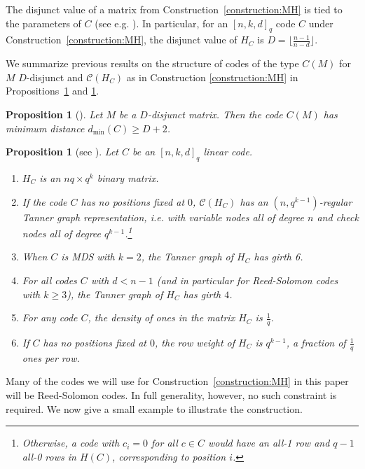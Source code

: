 \documentclass[11pt]{amsart}
\newtheorem{proposition}[theorem]{Proposition}
\theoremstyle{definition}
\newcommand{\0}{\mathbf{0}}
\begin{document}
The disjunct value of a matrix from Construction~\ref{construction:MH} is tied to the  parameters of $C$ (see e.g. \cite{kautz1964nonrandom, du2000combinatorial}). In particular, for an $[n,k,d]_q$ code $C$ under Construction~\ref{construction:MH}, the disjunct value of $H_{C}$ is $D = \lfloor \frac{n-1}{n-d} \rfloor$. 

We summarize previous results on the structure of codes of the type $C(M)$ for $M$ $D$-disjunct and $\mathcal{C}(H_C)$ as in Construction \ref{construction:MH} in Propositions~\ref{prop:mindis} and \ref{prop:properties}. 

\begin{proposition}[\cite{haymaker2025parity}] \label{prop:mindis}
    Let $M$ be a $D$-disjunct matrix. Then the code $C(M)$ has minimum distance $d_{\text{min}}(C) \geq D+2$.
\end{proposition}


\begin{proposition}[see \cite{haymaker2025parity}] \label{prop:properties}
Let $C$ be an $[n,k,d]_q$ linear code.
\begin{enumerate}
    \item $H_C$ is an $nq\times q^k$ binary matrix. 

    \item If the code $C$ has no positions fixed at $0$, $\mathcal{C}(H_C)$ has an $(n, q^{k-1})$-regular Tanner graph representation, i.e. with variable nodes all of degree $n$ and check nodes all of degree $q^{k-1}$.\footnote{Otherwise, a code with $c_i=0$ for all $c\in C$ would have an all-1 row and $q-1$ all-0 rows in $H(C)$, corresponding to position $i$. }

    \item When $C$ is MDS with $k=2$, the Tanner graph of $H_C$ has girth 6. 

    \item For all codes $C$ with $d<n-1$ (and in particular for Reed-Solomon codes with $k \geq 3$), the Tanner graph of $H_C$ has girth $4$.
    \item For any code $C$, the density of ones in the matrix $H_C$ is $\frac{1}{q}$.
    \item If $C$ has no positions fixed at $0$,  the row weight of $H_C$ is $q^{k-1}$, a fraction of $\frac{1}{q}$ ones per row.
\end{enumerate}
   
   
\end{proposition}


Many of the codes we will use for Construction~\ref{construction:MH} in this paper will be Reed-Solomon codes. In full generality, however, no such constraint is required. We now give a small example to illustrate the construction.
\end{document}
